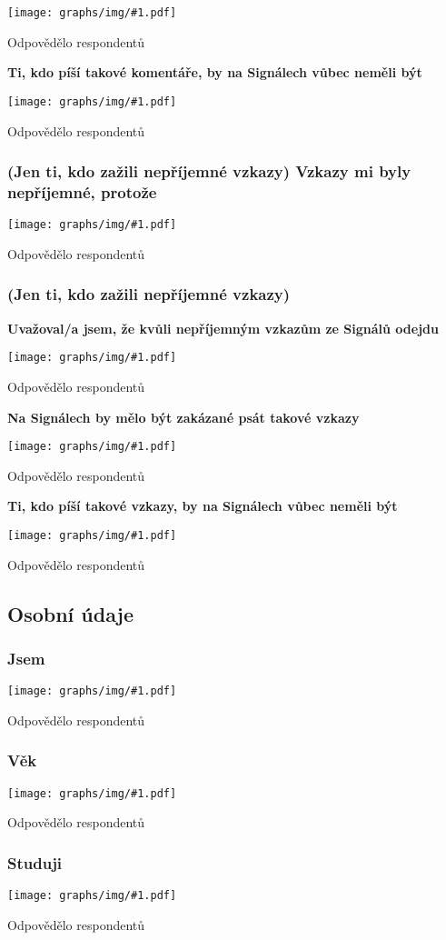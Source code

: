 \documentclass[12pt, a4paper, twoside]{article}
\newcommand{\answercount}[1]{Odpovědělo  respondentů}
\newcommand{\includegraph}[1]{
  \texttt{[image: graphs/img/\#1.pdf]}

  \answercount{#1}
}
\begin{document}
\includegraph{neprijemne_komentare_zakazat}

\textbf{Ti, kdo píší takové komentáře, by na Signálech vůbec neměli být}

\includegraph{neprijemne_komentare_pisatele_pryc}

\subsubsection{(Jen ti, kdo zažili nepříjemné vzkazy) Vzkazy mi byly nepříjemné, protože}

\includegraph{neprijemne_vzkazy_protoze}

\subsubsection{(Jen ti, kdo zažili nepříjemné vzkazy)}

\textbf{Uvažoval/a jsem, že kvůli nepříjemným vzkazům ze Signálů odejdu}

\includegraph{neprijemne_vzkazy_zvazoval_odchod}

\textbf{Na Signálech by mělo být zakázané psát takové vzkazy}

\includegraph{neprijemne_vzkazy_zakazat}

\textbf{Ti, kdo píší takové vzkazy, by na Signálech vůbec neměli být}

\includegraph{neprijemne_vzkazy_pisatele_pryc}

\subsection{Osobní údaje}\label{sec:osobni}

\subsubsection{Jsem}

\includegraph{jsem}

\subsubsection{Věk}

\includegraph{vek}

\subsubsection{Studuji}

\includegraph{studuji}
\end{document}
